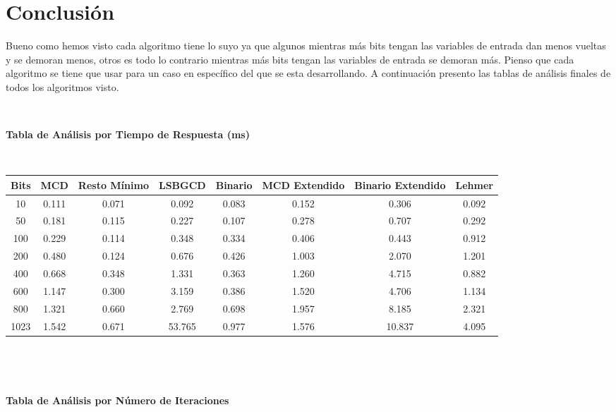 \documentclass[11pt, conference]{IEEEtran}
\begin{document}
\section{Conclusión}
Bueno como hemos visto cada algoritmo tiene lo suyo ya que algunos mientras más bits tengan las variables de entrada dan menos vueltas y se demoran menos, otros es todo lo contrario mientras más bits tengan las variables de entrada se demoran más. Pienso que cada algoritmo se tiene que usar para un caso en específico del que se esta desarrollando. A continuación presento las  tablas de análisis finales de todos los algoritmos visto.  

\

\textbf{Tabla de Análisis por Tiempo de Respuesta (ms)}

\

\begin{tabular}{|c|c|c|c|c|c|c|c|}
	\hline
	Bits & \textbf{MCD} & \textbf{Resto Mínimo} & \textbf{LSBGCD} & \textbf{Binario} & \textbf{MCD Extendido}& \textbf{Binario Extendido} & \textbf{Lehmer} \\	\hline
	10 & 0.111 & 0.071 & 0.092 & 0.083 & 0.152 & 0.306 & 0.092\\ \hline
	50 & 0.181  & 0.115 & 0.227 & 0.107 & 0.278 & 0.707 & 0.292\\ \hline
	100 & 0.229  & 0.114 & 0.348 & 0.334 & 0.406 & 0.443 & 0.912\\ \hline
	200 & 0.480 & 0.124 & 0.676 & 0.426 & 1.003 & 2.070 & 1.201\\ \hline
	400 & 0.668  & 0.348 & 1.331 & 0.363 & 1.260 & 4.715 & 0.882\\ \hline
	600 & 1.147 & 0.300 & 3.159 & 0.386 & 1.520 & 4.706 & 1.134\\ \hline
	800 & 1.321 & 0.660 & 2.769 & 0.698 & 1.957 & 8.185 & 2.321\\ \hline
	1023 & 1.542 & 0.671 & 53.765 & 0.977 & 1.576 & 10.837 & 4.095\\
	\hline		
\end{tabular}

\

\

\textbf{Tabla de Análisis por Número de Iteraciones}

\
\end{document}
